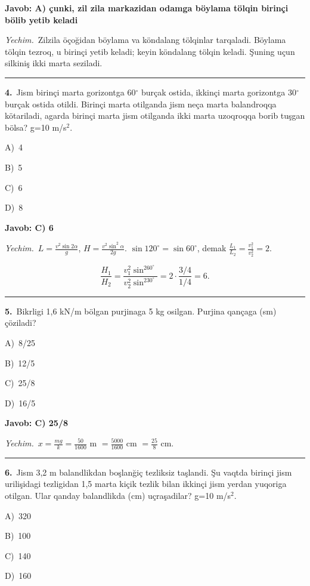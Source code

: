 \documentclass[11pt,a4paper]{article}
\newcommand{\opt}[2]{\hspace*{4mm}#1)\ #2\par}
\begin{document}
\noindent\colorbox{gray!12}{\parbox{\dimexpr\linewidth-2\fboxsep}{\textbf{Javob: A) çunki, zil zila markazidan odamga böylama tölqin birinçi bölib yetib keladi}}}\par\smallskip
\noindent\textit{Yechim.}\ Zilzila öçoğidan böylama va köndalang tölqinlar tarqaladi. Böylama tölqin tezroq, u birinçi yetib keladi; keyin köndalang tölqin keladi. Şuning uçun silkiniş ikki marta seziladi.\par\par\medskip\hrule\medskip
{}\noindent\begin{minipage}{\linewidth}
\textbf{4.}\ Jism birinçi marta gorizontga 60$^\circ$ burçak ostida, ikkinçi marta gorizontga 30$^\circ$ burçak ostida otildi. Birinçi marta otilganda jism neça marta balandroqqa kötariladi, agarda birinçi marta jism otilganda ikki marta uzoqroqqa borib tuşgan bölsa? g=10 m/s$^{2}$.\par\smallskip
\opt{A}{4}
\opt{B}{5}
\opt{C}{6}
\opt{D}{8}
\end{minipage}\vspace{2pt}\par
\noindent\colorbox{gray!12}{\parbox{\dimexpr\linewidth-2\fboxsep}{\textbf{Javob: C) 6}}}\par\smallskip
\noindent\textit{Yechim.}\ $L=\frac{v^2\sin2\alpha}{g}$, $H=\frac{v^2\sin^2\alpha}{2g}$. $\sin120^\circ=\sin60^\circ$, demak $\frac{L_1}{L_2}=\frac{v_1^2}{v_2^2}=2$.\par
\[\frac{H_1}{H_2}=\frac{v_1^2\sin^260^\circ}{v_2^2\sin^230^\circ}=2\cdot\frac{3/4}{1/4}=6.\]\par\medskip\hrule\medskip
{}\noindent\begin{minipage}{\linewidth}
\textbf{5.}\ Bikrligi 1,6 kN/m bölgan purjinaga 5 kg osilgan. Purjina qançaga (sm) çöziladi?\par\smallskip
\opt{A}{8/25}
\opt{B}{12/5}
\opt{C}{25/8}
\opt{D}{16/5}
\end{minipage}\vspace{2pt}\par
\noindent\colorbox{gray!12}{\parbox{\dimexpr\linewidth-2\fboxsep}{\textbf{Javob: C) 25/8}}}\par\smallskip
\noindent\textit{Yechim.}\ $x=\frac{mg}{k}=\frac{50}{1600}$ m $=\frac{5000}{1600}$ cm $=\frac{25}{8}$ cm.\par\par\medskip\hrule\medskip
{}\noindent\begin{minipage}{\linewidth}
\textbf{6.}\ Jism 3,2 m balandlikdan boşlanğiç tezliksiz taşlandi. Şu vaqtda birinçi jism urilişidagi tezligidan 1,5 marta kiçik tezlik bilan ikkinçi jism yerdan yuqoriga otilgan. Ular qanday balandlikda (cm) uçraşadilar? g=10 m/s$^{2}$.\par\smallskip
\opt{A}{320}
\opt{B}{100}
\opt{C}{140}
\opt{D}{160}
\end{minipage}\vspace{2pt}\par
\end{document}
